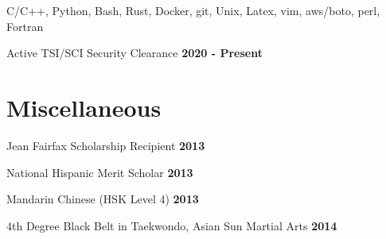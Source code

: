 \documentclass[margin,line]{resume}
\begin{document}
\begin{resume}
    \begin{list2}
    \item C/C++, Python, Bash, Rust, Docker, git, Unix, Latex, vim, aws/boto, perl, Fortran 
    \item Active TSI/SCI Security Clearance \hfill \textbf{2020 - Present}
    \end{list2}



    \section{\mysidestyle Miscellaneous}
    \hfill

    \begin{list2}
    \item Jean Fairfax Scholarship Recipient \hfill \textbf{2013}
    \item National Hispanic Merit Scholar \hfill \textbf{2013}
    \item Mandarin Chinese (HSK Level 4) \hfill \textbf{2013}
    \item 4th Degree Black Belt in Taekwondo, Asian Sun Martial Arts \hfill \textbf{2014}
    \end{list2}


\end{resume}
\end{document}
